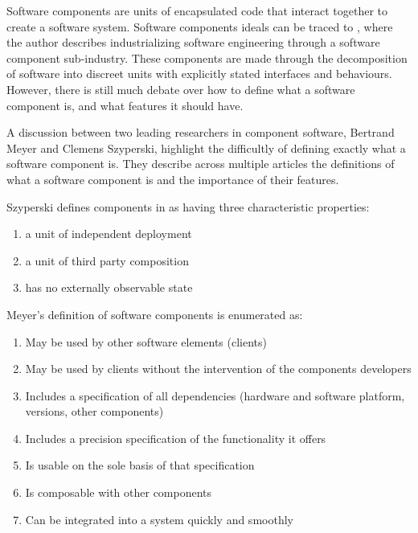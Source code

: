 Software components are units of encapsulated code that interact together to create a software system.
Software components ideals can be traced to \cite{McIlroy1969}, where the author describes industrializing software engineering through a software component sub-industry. 
These components are made through the decomposition of software into discreet units with explicitly stated interfaces and behaviours.
However, there is still much debate over how to define what a software component is, and what features it should have.

A discussion between two leading researchers in component software, Bertrand Meyer and Clemens Szyperski, highlight the difficultly of defining exactly what a software component is. 
They describe across multiple articles \cite{Meyer1999,Szyperski2000a, Szyperski2000, Meyer2000,} the definitions of what a software component is and the importance of their features.

Szyperski defines components in \cite{Szyperski2002} as having three characteristic properties:
\begin{enumerate}
  \item a unit of independent deployment
  \item a unit of third party composition
  \item has no externally observable state
\end{enumerate}

Meyer's definition of software components is enumerated as:
\begin{enumerate}
  \item May be used by other software elements (clients)
  \item May be used by clients without the intervention of the components developers
  \item Includes a specification of all dependencies (hardware and software platform, versions, other components)
  \item Includes a precision specification of the functionality it offers
  \item Is usable on the sole basis of that specification
  \item Is composable with other components
  \item Can be integrated into a system quickly and smoothly
\end{enumerate}

